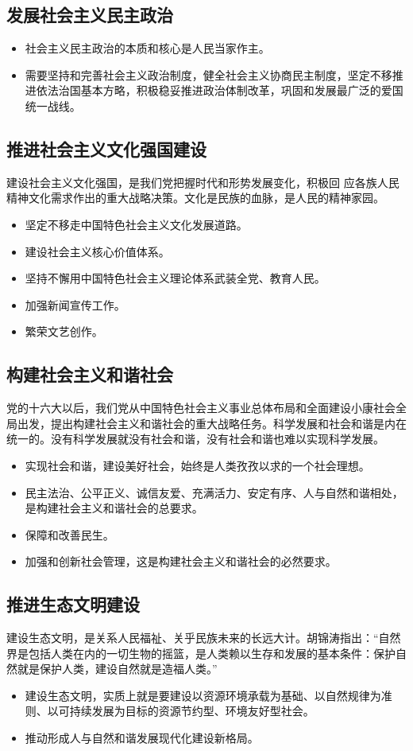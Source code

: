 \documentclass[12pt,openany]{ctexbook}
\begin{document}
\subsection{发展社会主义民主政治}
\begin{itemize}
  \item 社会主义民主政治的本质和核心是人民当家作主。
  \item 需要坚持和完善社会主义政治制度，健全社会主义协商民主制度，坚定不移推进依法治国基本方略，积极稳妥推进政治体制改革，巩固和发展最广泛的爱国统一战线。
\end{itemize}
\subsection{推进社会主义文化强国建设}
建设社会主义文化强国，是我们党把握时代和形势发展变化，积极回 应各族人民精神文化需求作出的重大战略决策。文化是民族的血脉，是人民的精神家园。
\begin{itemize}
  \item 坚定不移走中国特色社会主义文化发展道路。
  \item 建设社会主义核心价值体系。
  \item 坚持不懈用中国特色社会主义理论体系武装全党、教育人民。
  \item 加强新闻宣传工作。
  \item 繁荣文艺创作。
\end{itemize}
\subsection{构建社会主义和谐社会}
党的十六大以后，我们党从中国特色社会主义事业总体布局和全面建设小康社会全局出发，提出构建社会主义和谐社会的重大战略任务。科学发展和社会和谐是内在统一的。没有科学发展就没有社会和谐，没有社会和谐也难以实现科学发展。
\begin{itemize}
  \item 实现社会和谐，建设美好社会，始终是人类孜孜以求的一个社会理想。
  \item 民主法治、公平正义、诚信友爱、充满活力、安定有序、人与自然和谐相处，是构建社会主义和谐社会的总要求。
  \item 保障和改善民生。
  \item 加强和创新社会管理，这是构建社会主义和谐社会的必然要求。
\end{itemize}
\subsection{推进生态文明建设}
建设生态文明，是关系人民福祉、关乎民族未来的长远大计。胡锦涛指出：“自然界是包括人类在内的一切生物的摇篮，是人类赖以生存和发展的基本条件：保护自然就是保护人类，建设自然就是造福人类。”
\begin{itemize}
  \item 建设生态文明，实质上就是要建设以资源环境承载为基础、以自然规律为准则、以可持续发展为目标的资源节约型、环境友好型社会。
  \item 推动形成人与自然和谐发展现代化建设新格局。
\end{itemize}
\end{document}
